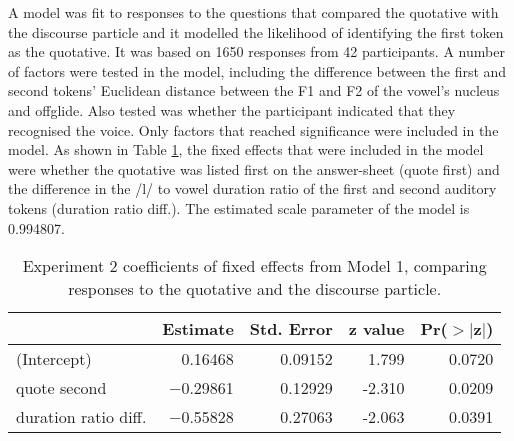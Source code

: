 A model was fit to responses to the questions that compared the quotative with the discourse particle and it modelled the likelihood of identifying the first token as the quotative.  It was based on 1650 responses from 42 participants. A number of factors were tested in the model, including the difference between the first and second tokens' Euclidean distance between the F1 and F2 of the vowel's nucleus and offglide.  Also tested was whether the participant indicated that they recognised the voice.  Only factors that reached significance were included in the model.  As shown in Table \ref{qdcoeff2}, the fixed effects that were included in the model were whether the quotative was listed first on the answer-sheet (quote first) and the difference in the /l/ to vowel duration ratio of the first and second auditory tokens (duration ratio diff.).  The estimated scale parameter of the model is 0.994807.  



\begin{table}[ht]
\begin{center}
\begin{tabular}{lrrrr}
  \hline
 & Estimate & Std. Error & z value& Pr($>$$|$z$|$)   \\
  \hline
(Intercept) & 0.16468 &   0.09152 &  1.799 &  0.0720 \\
  quote second & $-$0.29861  &  0.12929 & -2.310  & 0.0209 \\
  duration ratio diff. & $-$0.55828  &  0.27063  & -2.063 &  0.0391 \\
   \hline
\end{tabular}
\caption{Experiment 2 coefficients of fixed effects from Model 1, comparing responses to the quotative and the discourse particle.}
\label{qdcoeff2}
\end{center}
\end{table}

